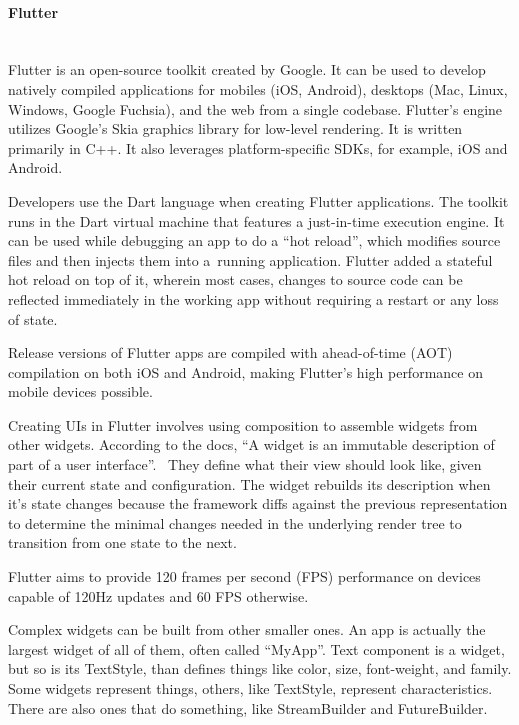 \paragraph{\large{Flutter}}\mbox{}\\[2pt]
Flutter is an open-source toolkit created by Google. It can be used to develop natively compiled applications for mobiles (iOS, Android), desktops (Mac, Linux, Windows, Google Fuchsia), and the web from a single codebase. Flutter's engine utilizes Google's Skia graphics library for low-level rendering. It is written primarily in C++. It also leverages platform-specific SDKs, for example, iOS and Android.

Developers use the Dart language when creating Flutter applications. The toolkit runs in the Dart virtual machine that features a just-in-time execution engine. It can be used while debugging an app to do a ``hot reload'', which modifies source files and then injects them into a~running application. Flutter added a stateful hot reload on top of it, wherein most cases, changes to source code can be reflected immediately in the working app without requiring a restart or any loss of state.

Release versions of Flutter apps are compiled with ahead-of-time (AOT) compilation on both iOS and Android, making Flutter's high performance on mobile devices possible.~\cite{flutter-wiki}

Creating UIs in Flutter involves using composition to assemble widgets from other widgets. According to the docs, ``A widget is an immutable description of part of a user interface''.~\cite{flutter} They define what their view should look like, given their current state and configuration. The widget rebuilds its description when it's state changes because the framework diffs against the previous representation to determine the minimal changes needed in the underlying render tree to transition from one state to the next.

Flutter aims to provide 120 frames per second (FPS) performance on devices capable of 120Hz updates and 60 FPS otherwise.

Complex widgets can be built from other smaller ones. An app is actually the largest widget of all of them, often called ``MyApp''. Text component is a widget, but so is its TextStyle, than defines things like color, size, font-weight, and family. Some widgets represent things, others, like TextStyle, represent characteristics. There are also ones that do something, like StreamBuilder and FutureBuilder.

